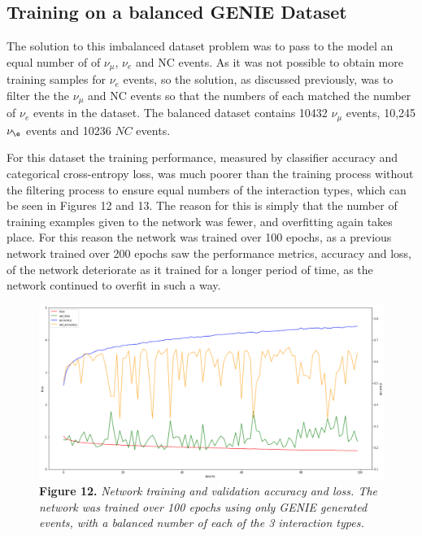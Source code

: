 \subsection{Training on a balanced GENIE Dataset}

\noindent The solution to this imbalanced dataset problem was to pass to the model an equal number of of $\nu_\mu$, $\nu_e$ and NC events. As it was not possible to obtain more training samples for $\nu_e$ events, so the solution, as discussed previously, was to filter the the $\nu_\mu$ and NC events so that the numbers of each matched the number of $\nu_e$ events in the dataset. The balanced dataset contains 10432 $\nu_\mu$ events, 10,245 $\nu_\e$ events and 10236 $NC$ events. \medskip

\noindent For this dataset the training performance, measured by classifier accuracy and categorical cross-entropy loss, was much poorer than the training process without the filtering process to ensure equal numbers of the interaction types, which can be seen in Figures 12 and 13. The reason for this is simply that the number of training examples given to the network was fewer, and overfitting again takes place. For this reason the network was trained over 100 epochs, as a previous network trained over 200 epochs saw the performance metrics, accuracy and loss, of the network deteriorate as it trained for a longer period of time, as the network continued to overfit in such a way. \medskip

\begin{figure}[t!]
 \centering
 \includegraphics[width=160mm]{genie/bal_genie/bal_genie_acc.png}
 \textbf{Figure 12.} \textit{Network training and validation accuracy and loss. The network was trained over 100 epochs using only GENIE generated events, with a balanced number of each of the 3 interaction types.}
\end{figure}

